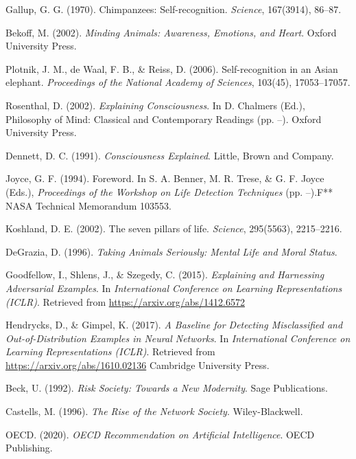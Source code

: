 \documentclass[12pt]{article}
\begin{document}
\begin{thebibliography}{999}
Gallup, G. G. (1970).
Chimpanzees: Self-recognition.
\textit{Science}, 167(3914), 86--87.

Bekoff, M. (2002).
\textit{Minding Animals: Awareness, Emotions, and Heart}.
Oxford University Press.

Plotnik, J. M., de Waal, F. B., \& Reiss, D. (2006).
Self-recognition in an Asian elephant.
\textit{Proceedings of the National Academy of Sciences}, 103(45), 17053--17057.

Rosenthal, D. (2002). 
\textit{Explaining Consciousness}. In D. Chalmers (Ed.), Philosophy of Mind: Classical and Contemporary Readings (pp. --). Oxford University Press.

Dennett, D. C. (1991).
\textit{Consciousness Explained}.
Little, Brown and Company.

Joyce, G. F. (1994).
Foreword. In S. A. Benner, M. R. Trese, \& G. F. Joyce (Eds.), 
\textit{Proceedings of the Workshop on Life Detection Techniques} (pp. --).F**
NASA Technical Memorandum 103553.

Koshland, D. E. (2002).
The seven pillars of life.
\textit{Science}, 295(5563), 2215--2216.

DeGrazia, D. (1996).
\textit{Taking Animals Seriously: Mental Life and Moral Status}.

Goodfellow, I., Shlens, J., \& Szegedy, C. (2015).
\textit{Explaining and Harnessing Adversarial Examples}.
In \textit{International Conference on Learning Representations (ICLR)}.
Retrieved from \url{https://arxiv.org/abs/1412.6572}

Hendrycks, D., \& Gimpel, K. (2017).
\textit{A Baseline for Detecting Misclassified and Out-of-Distribution Examples in Neural Networks}.
In \textit{International Conference on Learning Representations (ICLR)}.
Retrieved from \url{https://arxiv.org/abs/1610.02136}
Cambridge University Press.

Beck, U. (1992). 
\textit{Risk Society: Towards a New Modernity}. 
Sage Publications.

Castells, M. (1996). 
\textit{The Rise of the Network Society}. 
Wiley-Blackwell.

OECD. (2020). 
\textit{OECD Recommendation on Artificial Intelligence}. 
OECD Publishing.


\end{thebibliography}
\end{document}
